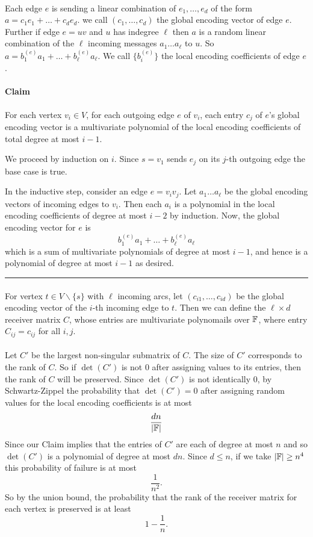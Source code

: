 \documentclass[letterpaper,12pt,oneside,onecolumn]{article}
\newenvironment{proof}{{\bf Proof:  }}{\hfill\rule{2mm}{2mm}}
\begin{document}
\paragraph{}
Each edge $e$ is sending a linear combination of $e_1, \dots, e_d$ of the form $a=c_1e_1 + \dots + c_d e_d$. we call $(c_1,\dots,c_d)$ the global encoding vector of edge $e$. Further if edge $e=uv$ and $u$ has indegree $\ell$ then $a$ is a random linear combination of the $\ell$ incoming messages $a_1 \dots a_\ell$ to $u$. So $a = b_1^{(e)} a_1 + \dots + b_\ell^{(e)} a_\ell$. We call $\{b_i^{(e)}\}$ the local encoding coefficients of edge $e$.
\paragraph{Claim}
For each vertex $v_i \in V$, for each outgoing edge $e$ of $v_i$, each entry $c_j$ of $e$'s global encoding vector is a multivariate polynomial of the local encoding coefficients of total degree at most $i-1$.

\begin{proof}
	We proceed by induction on $i$. Since $s=v_1$ sends $e_j$ on its $j$-th outgoing edge the base case is true.
	
	In the inductive step, consider an edge $e=v_iv_j$. Let $a_1 \dots a_\ell$ be the global encoding vectors of incoming edges to $v_i$. Then each $a_i$ is a polynomial in the local encoding coefficients of degree at most $i-2$ by induction. Now, the global encoding vector for $e$ is
	$$b_1^{(e)}a_1 + \dots + b_\ell^{(e)}a_\ell$$
	which is a sum of multivariate polynomials of degree at most $i-1$, and hence is a polynomial of degree at most $i-1$ as desired.
\end{proof}
\paragraph{}
For vertex $t \in V\backslash \{s\}$ with $\ell$ incoming arcs, let $(c_{i1}, \dots, c_{id})$ be the global encoding vector of the $i$-th incoming edge to $t$. Then we can define the $\ell \times d$ receiver matrix $C$, whose entries are multivariate polynomails over $\mathbb{F}$, where entry $C_{ij} = c_{ij}$ for all $i,j$.
\paragraph{}
Let $C'$ be the largest non-singular submatrix of $C$. The size of $C'$ corresponds to the rank of $C$. So if $\det(C')$ is not $0$ after assigning values to its entries, then the rank of $C$ will be preserved. Since $\det(C')$ is not identically $0$, by Schwartz-Zippel the probability that $\det(C') =0$ after assigning random values for the local encoding coefficients is at most 
$$\frac{dn}{|\mathbb{F}|}$$
Since our Claim implies that the entries of $C'$ are each of degree at most $n$ and so $\det(C')$ is a polynomial of degree at most $dn$. Since $d\leq n$, if we take $|\mathbb{F}| \geq n^4$ this probability of failure is at most 
$$\frac{1}{n^2}.$$
So by the union bound, the probability that the rank of the receiver matrix for each vertex is preserved is at least
$$1-\frac{1}{n}.$$
\end{document}
